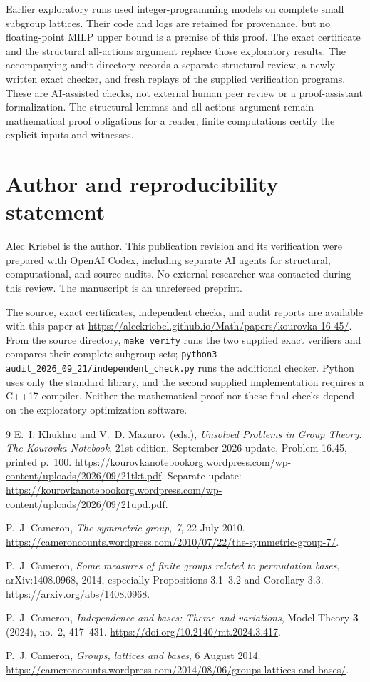 \documentclass[11pt]{article}
\theoremstyle{remark}\newtheorem{remark}[theorem]{Remark}
\begin{document}
Earlier exploratory runs used integer-programming models on complete small
subgroup lattices. Their code and logs are retained for provenance, but no
floating-point MILP upper bound is a premise of this proof. The exact
certificate and the structural all-actions argument replace those exploratory
results. The accompanying audit directory records a separate structural review,
a newly written exact checker, and fresh replays of the supplied verification
programs. These are AI-assisted checks, not external human peer review or a
proof-assistant formalization. The structural lemmas and all-actions argument
remain mathematical proof obligations for a reader; finite computations
certify the explicit inputs and witnesses.

\newpage
\section*{Author and reproducibility statement}
Alec Kriebel is the author. This publication revision and its verification
were prepared with OpenAI Codex, including separate AI agents for structural,
computational, and source audits. No external researcher was contacted during
this review. The manuscript is an unrefereed preprint.

The source, exact certificates, independent checks, and audit reports are
available with this paper at
\url{https://aleckriebel.github.io/Math/papers/kourovka-16-45/}.
From the source directory, \texttt{make verify} runs the two supplied exact
verifiers and compares their complete subgroup sets;
\texttt{python3 audit\_2026\_09\_21/independent\_check.py} runs the additional
checker. Python uses only the standard library, and the second supplied
implementation requires a C++17 compiler. Neither the mathematical proof nor
these final checks depend on the exploratory optimization software.

\begin{thebibliography}{9}
E.~I. Khukhro and V.~D. Mazurov (eds.),
\emph{Unsolved Problems in Group Theory: The Kourovka Notebook}, 21st edition,
September 2026 update, Problem 16.45, printed p.~100.
\url{https://kourovkanotebookorg.wordpress.com/wp-content/uploads/2026/09/21tkt.pdf}.
Separate update:
\url{https://kourovkanotebookorg.wordpress.com/wp-content/uploads/2026/09/21upd.pdf}.

P.~J. Cameron, \emph{The symmetric group, 7}, 22 July 2010.
\url{https://cameroncounts.wordpress.com/2010/07/22/the-symmetric-group-7/}.

P.~J. Cameron, \emph{Some measures of finite groups related to permutation
bases}, arXiv:1408.0968, 2014, especially Propositions 3.1--3.2 and
Corollary 3.3. \url{https://arxiv.org/abs/1408.0968}.

P.~J. Cameron, \emph{Independence and bases: Theme and variations},
Model Theory \textbf{3} (2024), no.~2, 417--431.
\url{https://doi.org/10.2140/mt.2024.3.417}.

P.~J. Cameron, \emph{Groups, lattices and bases}, 6 August 2014.
\url{https://cameroncounts.wordpress.com/2014/08/06/groups-lattices-and-bases/}.
\end{thebibliography}
\end{document}
